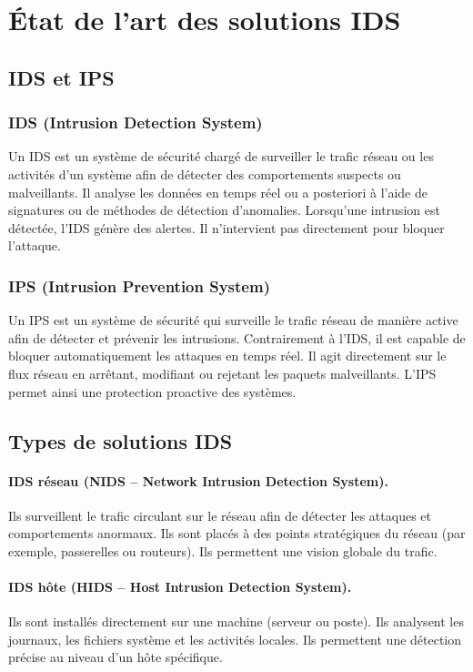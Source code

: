 \section{État de l'art des solutions IDS}
\subsection{IDS et IPS}
\subsubsection{IDS (Intrusion Detection System)}
Un IDS est un système de sécurité chargé de surveiller le trafic réseau ou les activités d'un système afin de détecter des comportements suspects ou malveillants. Il analyse les données en temps réel ou a posteriori à l'aide de signatures ou de méthodes de détection d'anomalies. Lorsqu'une intrusion est détectée, l'IDS génère des alertes. Il n'intervient pas directement pour bloquer l'attaque.

\subsubsection{IPS (Intrusion Prevention System)}
Un IPS est un système de sécurité qui surveille le trafic réseau de manière active afin de détecter et prévenir les intrusions. Contrairement à l'IDS, il est capable de bloquer automatiquement les attaques en temps réel. Il agit directement sur le flux réseau en arrêtant, modifiant ou rejetant les paquets malveillants. L'IPS permet ainsi une protection proactive des systèmes.

\subsection{Types de solutions IDS}
\paragraph{IDS réseau (NIDS -- Network Intrusion Detection System).} Ils surveillent le trafic circulant sur le réseau afin de détecter les attaques et comportements anormaux. Ils sont placés à des points stratégiques du réseau (par exemple, passerelles ou routeurs). Ils permettent une vision globale du trafic.

\paragraph{IDS hôte (HIDS -- Host Intrusion Detection System).} Ils sont installés directement sur une machine (serveur ou poste). Ils analysent les journaux, les fichiers système et les activités locales. Ils permettent une détection précise au niveau d'un hôte spécifique.

